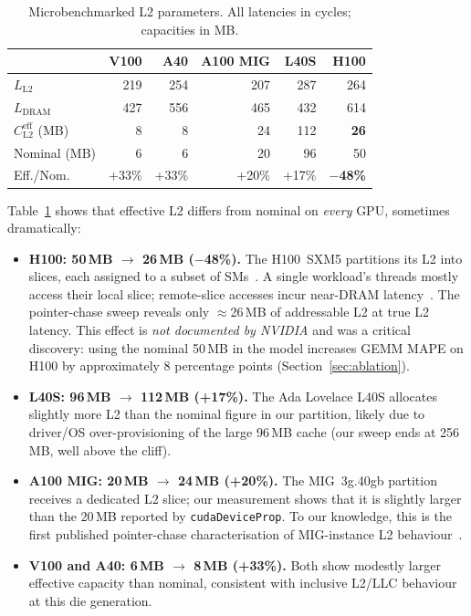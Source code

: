 \documentclass[10pt,twocolumn]{article}
\newcommand{\cleff}{C_{\text{L2}}^{\text{eff}}}
\newcommand{\LLtwo}{L_{\text{L2}}}
\newcommand{\Ldram}{L_{\text{DRAM}}}
\begin{document}
\begin{table}[t]
\centering
\small
\caption{Microbenchmarked L2 parameters.  All latencies in cycles;
capacities in MB.}
\label{tab:microbench}
\renewcommand{\arraystretch}{1.2}
\begin{tabular}{@{}lrrrrr@{}}
\toprule
 & \textbf{V100} & \textbf{A40} & \textbf{A100 MIG} & \textbf{L40S}
 & \textbf{H100} \\
\midrule
$\LLtwo$                   & 219   & 254   & 207   & 287   & 264 \\
$\Ldram$                   & 427   & 556   & 465   & 432   & 614 \\
$\cleff$ (MB)              & 8     & 8     & 24    & 112   & \textbf{26} \\
Nominal (MB)               & 6     & 6     & 20    & 96    & 50 \\
\midrule
Eff./Nom.                  & +33\% & +33\% & +20\% & +17\%
                           & \textbf{$-$48\%} \\
\bottomrule
\end{tabular}
\end{table}

Table~\ref{tab:microbench} shows that effective L2 differs from
nominal on \emph{every} GPU, sometimes dramatically:

\begin{itemize}
\item \textbf{H100: 50\,MB $\to$ 26\,MB ($-$48\%).}
  The H100~SXM5 partitions its L2 into slices, each assigned to a
  subset of SMs~\cite{hopper_ieee}.  A single workload's threads
  mostly access their local slice; remote-slice accesses incur
  near-DRAM latency~\cite{gpu_noc}.  The pointer-chase sweep
  reveals only $\approx$26\,MB of addressable L2 at true L2
  latency.  This effect is \emph{not documented by NVIDIA} and was
  a critical discovery: using the nominal 50\,MB in the model
  increases GEMM MAPE on H100 by approximately 8 percentage points
  (Section~\ref{sec:ablation}).
\item \textbf{L40S: 96\,MB $\to$ 112\,MB (+17\%).}
  The Ada Lovelace L40S allocates slightly more L2 than the nominal
  figure in our partition, likely due to driver/OS over-provisioning
  of the large 96\,MB cache (our sweep ends at 256\,MB, well above
  the cliff).
\item \textbf{A100 MIG: 20\,MB $\to$ 24\,MB (+20\%).}
  The MIG~3g.40gb partition receives a dedicated L2 slice; our
  measurement shows that it is slightly larger than the 20\,MB
  reported by \texttt{cudaDeviceProp}.  To our knowledge, this is
  the first published pointer-chase characterisation of
  MIG-instance L2 behaviour~\cite{mig_guide}.
\item \textbf{V100 and A40: 6\,MB $\to$ 8\,MB (+33\%).}
  Both show modestly larger effective capacity than nominal,
  consistent with inclusive L2/LLC behaviour at this die generation.
\end{itemize}
\end{document}
